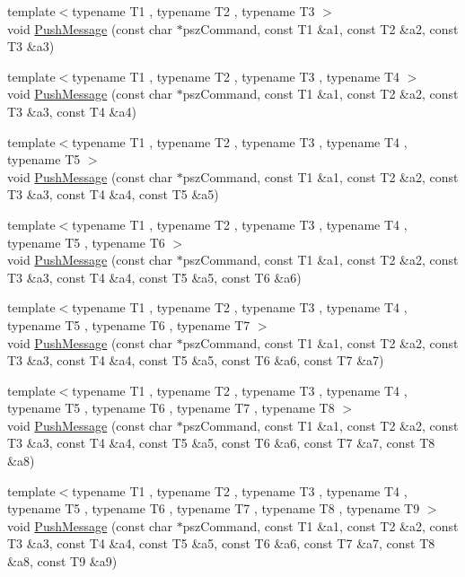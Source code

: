 \begin{DoxyCompactItemize}
{\footnotesize template$<$typename T1 , typename T2 , typename T3 $>$ }\\void \hyperlink{class_c_node_a79355956a00c38d855b986a34e7ba444}{Push\+Message} (const char $\ast$psz\+Command, const T1 \&a1, const T2 \&a2, const T3 \&a3)
\item 
{\footnotesize template$<$typename T1 , typename T2 , typename T3 , typename T4 $>$ }\\void \hyperlink{class_c_node_a2958ee10e2c96ef647787bce80196079}{Push\+Message} (const char $\ast$psz\+Command, const T1 \&a1, const T2 \&a2, const T3 \&a3, const T4 \&a4)
\item 
{\footnotesize template$<$typename T1 , typename T2 , typename T3 , typename T4 , typename T5 $>$ }\\void \hyperlink{class_c_node_a1f58deeed29baf57c49dae177f8be826}{Push\+Message} (const char $\ast$psz\+Command, const T1 \&a1, const T2 \&a2, const T3 \&a3, const T4 \&a4, const T5 \&a5)
\item 
{\footnotesize template$<$typename T1 , typename T2 , typename T3 , typename T4 , typename T5 , typename T6 $>$ }\\void \hyperlink{class_c_node_a4addbff355c502fb2f8c10451e76373d}{Push\+Message} (const char $\ast$psz\+Command, const T1 \&a1, const T2 \&a2, const T3 \&a3, const T4 \&a4, const T5 \&a5, const T6 \&a6)
\item 
{\footnotesize template$<$typename T1 , typename T2 , typename T3 , typename T4 , typename T5 , typename T6 , typename T7 $>$ }\\void \hyperlink{class_c_node_ab3611cdb08d5f25a4da05fe140e48625}{Push\+Message} (const char $\ast$psz\+Command, const T1 \&a1, const T2 \&a2, const T3 \&a3, const T4 \&a4, const T5 \&a5, const T6 \&a6, const T7 \&a7)
\item 
{\footnotesize template$<$typename T1 , typename T2 , typename T3 , typename T4 , typename T5 , typename T6 , typename T7 , typename T8 $>$ }\\void \hyperlink{class_c_node_af91d09012aa7e879be4b488b0bba903d}{Push\+Message} (const char $\ast$psz\+Command, const T1 \&a1, const T2 \&a2, const T3 \&a3, const T4 \&a4, const T5 \&a5, const T6 \&a6, const T7 \&a7, const T8 \&a8)
\item 
{\footnotesize template$<$typename T1 , typename T2 , typename T3 , typename T4 , typename T5 , typename T6 , typename T7 , typename T8 , typename T9 $>$ }\\void \hyperlink{class_c_node_a1af04d8219e8e6aafe5b6446000cd9ff}{Push\+Message} (const char $\ast$psz\+Command, const T1 \&a1, const T2 \&a2, const T3 \&a3, const T4 \&a4, const T5 \&a5, const T6 \&a6, const T7 \&a7, const T8 \&a8, const T9 \&a9)

\end{DoxyCompactItemize}
